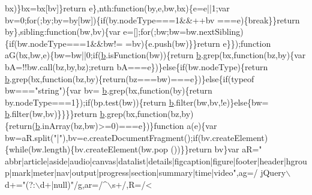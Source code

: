 \begin{DoxyCode}
      bx)\}bx=bx[bv]\}\textcolor{keywordflow}{return} e\},nth:\textcolor{keyword}{function}(by,e,bw,bx)\{e=e||1;var bv=0;\textcolor{keywordflow}{for}(;by;by=by[bw])\{\textcolor{keywordflow}{if}(by.nodeType===1&&++bv
      ===e)\{\textcolor{keywordflow}{break}\}\}\textcolor{keywordflow}{return} by\},sibling:\textcolor{keyword}{function}(bw,bv)\{var e=[];\textcolor{keywordflow}{for}(;bw;bw=bw.nextSibling)\{\textcolor{keywordflow}{if}(bw.nodeType===1&&bw!=
      =bv)\{e.push(bw)\}\}\textcolor{keywordflow}{return} e\}\});\textcolor{keyword}{function} aG(bx,bw,e)\{bw=bw||0;\textcolor{keywordflow}{if}(\hyperlink{docs_2_programmer's_manual_2html_2jquery_8js_aa4026ad5544b958e54ce5e106fa1c805}{b}.isFunction(bw))\{\textcolor{keywordflow}{return} 
      \hyperlink{docs_2_programmer's_manual_2html_2jquery_8js_aa4026ad5544b958e54ce5e106fa1c805}{b}.grep(bx,\textcolor{keyword}{function}(bz,by)\{var bA=!!bw.call(bz,by,bz);\textcolor{keywordflow}{return} bA===e\})\}\textcolor{keywordflow}{else}\{\textcolor{keywordflow}{if}(bw.nodeType)\{\textcolor{keywordflow}{return} 
      \hyperlink{docs_2_programmer's_manual_2html_2jquery_8js_aa4026ad5544b958e54ce5e106fa1c805}{b}.grep(bx,\textcolor{keyword}{function}(bz,by)\{\textcolor{keywordflow}{return}(bz===bw)===e\})\}\textcolor{keywordflow}{else}\{\textcolor{keywordflow}{if}(typeof bw===\textcolor{stringliteral}{"string"})\{var bv=
      \hyperlink{docs_2_programmer's_manual_2html_2jquery_8js_aa4026ad5544b958e54ce5e106fa1c805}{b}.grep(bx,\textcolor{keyword}{function}(by)\{\textcolor{keywordflow}{return} by.nodeType===1\});\textcolor{keywordflow}{if}(bp.test(bw))\{\textcolor{keywordflow}{return} \hyperlink{docs_2_programmer's_manual_2html_2jquery_8js_aa4026ad5544b958e54ce5e106fa1c805}{b}.filter(bw,bv,!e)\}\textcolor{keywordflow}{else}\{bw=
      \hyperlink{docs_2_programmer's_manual_2html_2jquery_8js_aa4026ad5544b958e54ce5e106fa1c805}{b}.filter(bw,bv)\}\}\}\}\textcolor{keywordflow}{return} \hyperlink{docs_2_programmer's_manual_2html_2jquery_8js_aa4026ad5544b958e54ce5e106fa1c805}{b}.grep(bx,\textcolor{keyword}{function}(bz,by)\{\textcolor{keywordflow}{return}(\hyperlink{docs_2_programmer's_manual_2html_2jquery_8js_aa4026ad5544b958e54ce5e106fa1c805}{b}.inArray(bz,bw)>=0)===e\})\}\textcolor{keyword}{function} a(e)\{var 
      bw=aR.split(\textcolor{stringliteral}{"|"}),bv=e.createDocumentFragment();\textcolor{keywordflow}{if}(bv.createElement)\{\textcolor{keywordflow}{while}(bw.length)\{bv.createElement(bw.pop
      ())\}\}\textcolor{keywordflow}{return} bv\}var aR=\textcolor{stringliteral}{"
      abbr|article|aside|audio|canvas|datalist|details|figcaption|figure|footer|header|hgroup|mark|meter|nav|output|progress|section|summary|time|video"},ag=/ jQuery\(\backslash\)d+=\textcolor{stringliteral}{"(?:\(\backslash\)d+|null)"}/g,ar=/^\(\backslash\)s+/,R=/<

\end{DoxyCode}
